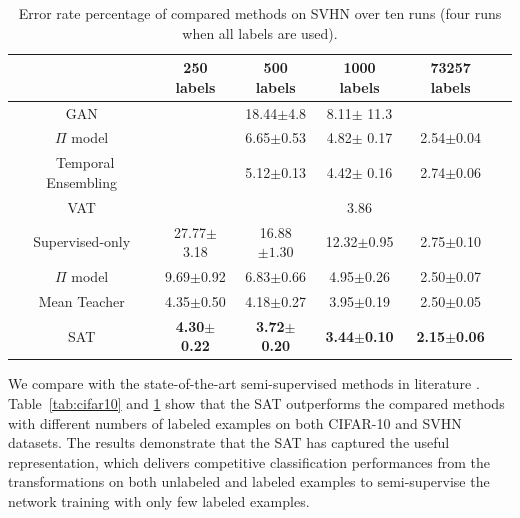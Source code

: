\documentclass[10pt,journal,compsoc,twoside]{IEEEtran}
\begin{document}
\begin{table}
\caption{Error rate percentage of compared methods on SVHN over ten runs (four runs when all labels are used).}\label{tab:svhn}
\vspace{2mm}
\centering
 \begin{tabular}{cccccc} \toprule
   &250 labels&500 labels&1000 labels&73257 labels\\ \midrule
GAN \cite{salimans2016improved}&&18.44$\pm$4.8&8.11$\pm$ 11.3 \\
$\Pi$ model \cite{laine2016temporal}&&6.65$\pm$0.53&4.82$\pm$ 0.17&2.54$\pm$0.04  \\ \
Temporal Ensembling \cite{laine2016temporal}&&5.12$\pm$0.13&4.42$\pm$ 0.16 &2.74$\pm$0.06\\
VAT \cite{miyato2018virtual} &&&3.86\\
Supervised-only&27.77$\pm$3.18&16.88$\pm 1.30$&12.32$\pm$0.95&2.75$\pm$0.10\\
$\Pi$ model \cite{tarvainen2017mean}&9.69$\pm$0.92&6.83$\pm$0.66&4.95$\pm$0.26&2.50$\pm$0.07\\
Mean Teacher \cite{tarvainen2017mean}&4.35$\pm$0.50&4.18$\pm$0.27&3.95$\pm$0.19&2.50$\pm$0.05\\\midrule
SAT&\textbf{4.30$\pm$0.22}&\textbf{3.72$\pm$0.20}&\textbf{3.44$\pm$0.10}&\textbf{2.15$\pm$0.06}\\
\bottomrule
\end{tabular}
\end{table}

We compare with the state-of-the-art semi-supervised methods in literature \cite{tarvainen2017mean,laine2016temporal}.
Table~\ref{tab:cifar10} and \ref{tab:svhn} show that the SAT outperforms the compared methods with different numbers of labeled examples on both CIFAR-10 and SVHN datasets.
The results demonstrate that the SAT has captured the useful representation, which delivers competitive classification performances from the transformations on both unlabeled and labeled examples to semi-supervise the network training with only few labeled examples.
\end{document}
